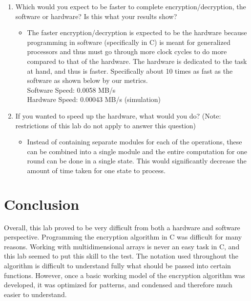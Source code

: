 \documentclass[journal, twocolumn, final,11pt,letterpaper]{IEEEtran}
\begin{document}
\begin{enumerate}
	\item Which would you expect to be faster to complete encryption/decryption, the software or hardware? Is this what your results show?
	\begin{itemize}
	\item The faster encryption/decryption is expected to be the hardware because programming in software (specifically in C) is meant for generalized processors and thus must go through more clock cycles to do more compared to that of the hardware. The hardware is dedicated to the task at hand, and thus is faster. Specifically about 10 times as fast as the software as shown below by our metrics. \\
		
			\setlength{\leftskip}{24pt}Software Speed: 0.0058 MB/s \\
			Hardware Speed: 0.00043 MB/s (simulation)\\
			
	\end{itemize}
	\item If you wanted to speed up the hardware, what would you do? (Note: restrictions of this lab do not apply to answer this question)
	\begin{itemize}
		\item Instead of containing separate modules for each of the operations, these can be combined into a single module and the entire computation for one round can be done in a single state. This would significantly decrease the amount of time taken for one state to process. 
	\end{itemize}
\end{enumerate}


\section{Conclusion}
Overall, this lab proved to be very difficult from both a hardware and software perspective. Programming the encryption algorithm in C was difficult for many reasons. Working with multidimensional arrays is never an easy task in C, and this lab seemed to put this skill to the test. The notation used throughout the algorithm is difficult to understand fully what should be passed into certain functions. However, once a basic working model of the encryption algorithm was developed, it was optimized for patterns, and condensed and therefore much easier to understand. \\
\end{document}
